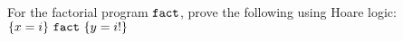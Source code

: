 \begin{exercise}
    For the factorial program $\mathtt{fact}$,
    prove the following using Hoare logic:$ \{ x = i \} ~\mathtt{fact}~ \{ y = i! \}$
\end{exercise}






